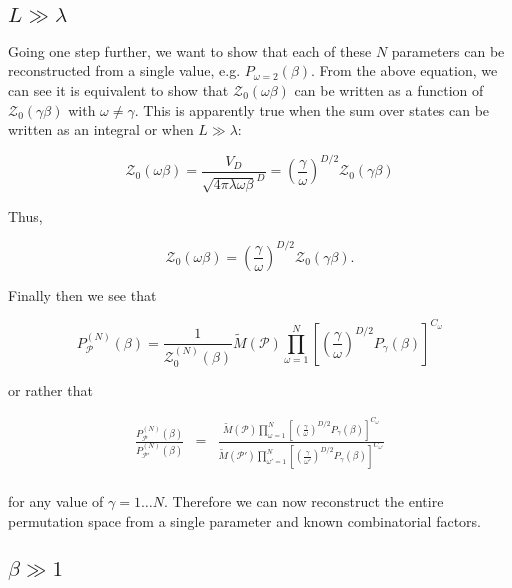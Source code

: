 \documentclass[aps,preprint,showpacs,superscriptaddress,groupedaddress]{revtex4}  %
\begin{document}
\subsection{$L \gg \lambda$}

Going one step further, we want to show that each of these $N$ parameters can be reconstructed from a single value, e.g. $P_{\omega=2}(\beta)$. From the above equation, we can see it is equivalent to show that $\mathcal{Z}_{0}(\omega\beta)$ can be written as a function of $\mathcal{Z}_{0}(\gamma\beta)$ with $\omega \neq \gamma$. This is apparently true when the sum over states can be written as an integral or when $L \gg \lambda$:

\begin{equation}
  \mathcal{Z}_{0}(\omega\beta) = \frac{V_{D}}{\sqrt{4\pi\lambda\omega\beta}^{D}} = (\frac{\gamma}{\omega})^{D/2} \mathcal{Z}_{0}(\gamma\beta)
\end{equation}

Thus,

\begin{equation}
  \mathcal{Z}_{0}(\omega\beta) = (\frac{\gamma}{\omega})^{D/2} \mathcal{Z}_{0}(\gamma\beta).
\end{equation}

Finally then we see that

\begin{equation}
  P_{\mathcal{P}}^{(N)}(\beta) = \frac{1}{\mathcal{Z}_{0}^{(N)}(\beta)} \tilde{M}(\mathcal{P}) \prod_{\omega=1}^{N} [(\frac{\gamma}{\omega})^{D/2} P_{\gamma}(\beta)]^{C_{\omega}}
\end{equation}

or rather that

\begin{eqnarray}
  \frac{P_{\mathcal{P}}^{(N)}(\beta)}{P_{\mathcal{P}'}^{(N)}(\beta)} &=& \frac{\tilde{M}(\mathcal{P}) \prod_{\omega=1}^{N} [(\frac{\gamma}{\omega})^{D/2} P_{\gamma}(\beta)]^{C_{\omega}}}{\tilde{M}(\mathcal{P}') \prod_{\omega'=1}^{N} [(\frac{\gamma}{\omega'})^{D/2} P_{\gamma}(\beta)]^{C_{\omega'}}} \\
\end{eqnarray}

for any value of $\gamma = 1 \dots N$. Therefore we can now reconstruct the entire permutation space from a single parameter and known combinatorial factors.

\subsection{$\beta \gg 1$}
\end{document}

